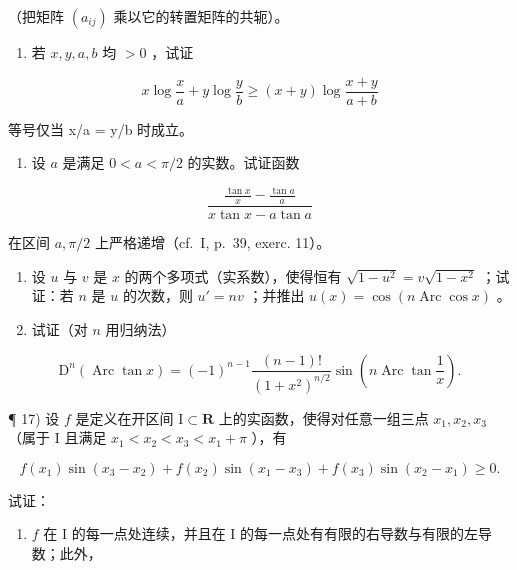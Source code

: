 （把矩阵 \((a_{ij})\) 乘以它的转置矩阵的共轭）。

\begin{enumerate}
\def\labelenumi{\arabic{enumi})}
\setcounter{enumi}{12}
\tightlist
\item
  若 \(x, y, a, b\) 均 \(> 0\) ，试证
\end{enumerate}

\[
x \log \frac {x}{a} + y \log \frac {y}{b} \geqslant (x + y) \log \frac {x + y}{a + b}
\]

等号仅当 x/a = y/b 时成立。

\begin{enumerate}
\def\labelenumi{\arabic{enumi})}
\setcounter{enumi}{13}
\tightlist
\item
  设 \(a\) 是满足 \(0 < a < \pi / 2\) 的实数。试证函数
\end{enumerate}

\[
\frac {\frac {\tan x}{x} - \frac {\tan a}{a}}{x \tan x - a \tan a}
\]

在区间 \(a, \pi/2\) 上严格递增（cf.~I, p.~39, exerc. 11）。

\begin{enumerate}
\def\labelenumi{\arabic{enumi})}
\setcounter{enumi}{14}
\item
  设 \(u\) 与 \(v\) 是 \(x\) 的两个多项式（实系数），使得恒有 \(\sqrt{1 - u^2} = v\sqrt{1 - x^2}\) ；试证：若 \(n\) 是 \(u\) 的次数，则 \(u' = nv\) ；并推出 \(u(x) = \cos(n\operatorname{Arc}\cos x)\) 。
\item
  试证（对 \(n\) 用归纳法）
\end{enumerate}

\[
\mathrm{D} ^ {n} \left(\operatorname{Arc} \tan x\right) = (- 1) ^ {n - 1} \frac {(n - 1) !}{(1 + x ^ {2}) ^ {n / 2}} \sin \left(n \operatorname{Arc} \tan \frac {1}{x}\right).
\]

¶ 17) 设 \(f\) 是定义在开区间 \(\mathrm{I}\subset \mathbf{R}\) 上的实函数，使得对任意一组三点 \(x_{1}, x_{2}, x_{3}\) （属于 I 且满足 \(x_{1} < x_{2} < x_{3} < x_{1} + \pi\) ），有

\[
f \left(x _ {1}\right) \sin \left(x _ {3} - x _ {2}\right) + f \left(x _ {2}\right) \sin \left(x _ {1} - x _ {3}\right) + f \left(x _ {3}\right) \sin \left(x _ {2} - x _ {1}\right) \geqslant 0.\tag{1}
\]

试证：

\begin{enumerate}
\def\labelenumi{\alph{enumi})}
\tightlist
\item
  \(f\) 在 I 的每一点处连续，并且在 I 的每一点处有有限的右导数与有限的左导数；此外，
\end{enumerate}


